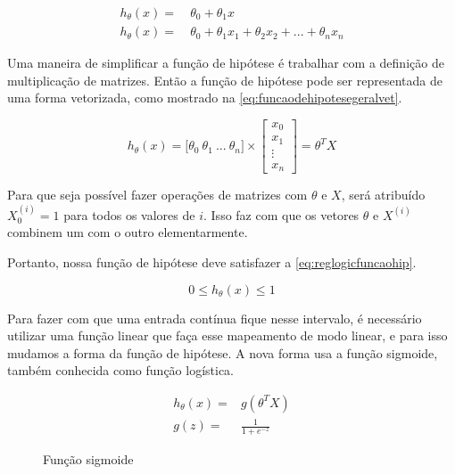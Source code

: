 \begin{align}
h_{\theta}(x) = &\ \theta_0 + \theta_1 x \label{eq:funcaodehipotese} \\
h_{\theta}(x) = &\ \theta_0 + \theta_1 x_1 + \theta_2 x_2 + ... + \theta_n x_n \label{eq:funcaodehipotesegeral}
\end{align}

Uma maneira de simplificar a função de hipótese é trabalhar com a definição de multiplicação de matrizes. Então a função de hipótese pode ser representada de uma forma vetorizada, como mostrado na \autoref{eq:funcaodehipotesegeralvet}. 

\begin{equation}
h_{\theta}(x) = \big[\theta_0\ \theta_1\ ...\ \theta_n\big] \times \begin{bmatrix} x_0 \\ x_1 \\ \vdots \\ x_n \end{bmatrix}  = \theta^TX \label{eq:funcaodehipotesegeralvet}
\end{equation}

Para que seja possível fazer operações de matrizes com $\theta$ e $X$, será atribuído $X_0^{(i)} = 1$ para todos os valores de $i$. Isso faz com que os vetores $\theta$ e $X^{(i)}$ combinem um com o outro elementarmente.

Portanto, nossa função de hipótese deve satisfazer a \autoref{eq:reglogicfuncaohip}.

\begin{equation}\label{eq:reglogicfuncaohip}
0 \leq h_{\theta}(x) \leq 1
\end{equation}

Para fazer com que uma entrada contínua fique nesse intervalo, é necessário utilizar uma função linear que faça esse mapeamento de modo linear, e para isso mudamos a forma da função de hipótese. A nova forma usa a função sigmoide, também conhecida como função logística.

\begin{align}
h_{\theta}(x) = & g(\theta^TX) \nonumber \\
g(z) = & \frac{1}{1 + e^{-z}} \label{eq:funcaosigmoide}
\end{align}

\begin{figure}[!htb]
  \caption{Função sigmoide}
  \label{fig:funcaosigmoide}
  \begin{center}
  \end{center}
\end{figure}

